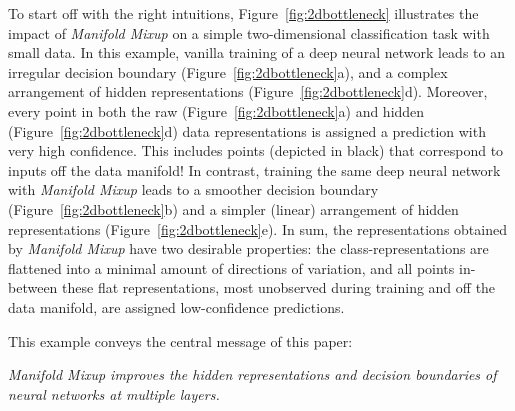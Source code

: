 \documentclass{article} \usepackage[preprint]{nips_2018}
\newcommand{\manifoldmixup}{\textit{Manifold Mixup}}
\begin{document}
To start off with the right intuitions, Figure~\ref{fig:2dbottleneck} illustrates the impact of \manifoldmixup{} on a simple two-dimensional classification task with small data.
In this example, vanilla training of a deep neural network leads to an irregular decision boundary (Figure~\ref{fig:2dbottleneck}a), and a complex arrangement of hidden representations (Figure~\ref{fig:2dbottleneck}d).
Moreover, every point in both the raw (Figure~\ref{fig:2dbottleneck}a) and hidden (Figure~\ref{fig:2dbottleneck}d) data representations is assigned a prediction with very high confidence.
This includes points (depicted in black) that correspond to inputs off the data manifold!  
In contrast, training the same deep neural network with \manifoldmixup{} leads to a smoother decision boundary (Figure~\ref{fig:2dbottleneck}b) and a simpler (linear) arrangement of hidden representations (Figure~\ref{fig:2dbottleneck}e).
In sum, the representations obtained by \manifoldmixup{} have two desirable properties: the class-representations are flattened into a minimal amount of directions of variation, and all points in-between these flat representations, most unobserved during training and off the data manifold, are assigned low-confidence predictions.
 
This example conveys the central message of this paper:
\begin{center}
    \emph{Manifold Mixup improves the hidden representations and decision boundaries of neural networks at multiple layers.}
\end{center}
\end{document}
